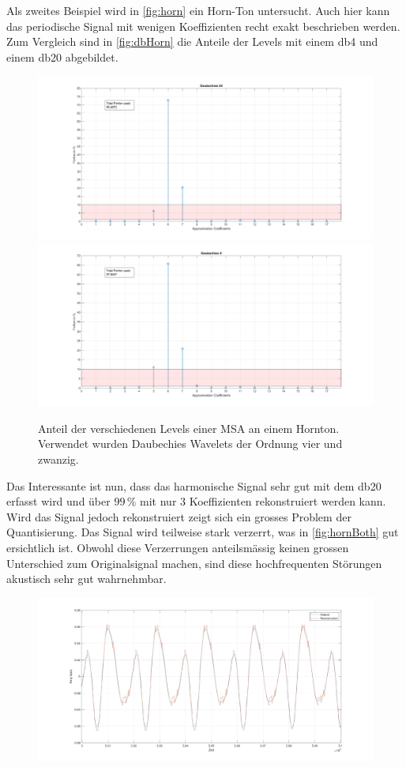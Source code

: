 \begin{refsection}
Als zweites Beispiel wird in \autoref{fig:horn} ein Horn-Ton untersucht.
Auch hier kann das periodische Signal mit wenigen Koeffizienten recht exakt beschrieben werden. 
Zum Vergleich sind in \autoref{fig:dbHorn} die Anteile der Levels mit einem db4 und einem db20 abgebildet.
\begin{figure}
	\includegraphics[width=0.5\linewidth]{papers/compress/Bilder/frenchHorn_db20.pdf}
	\includegraphics[width=0.5\linewidth]{papers/compress/Bilder/frenchHorn_db4.pdf}
	\caption{Anteil der verschiedenen Levels einer MSA an einem Hornton. Verwendet wurden Daubechies Wavelets der Ordnung vier und zwanzig.}
	\label{fig:dbHorn}
\end{figure}
Das Interessante ist nun, dass das harmonische Signal sehr gut mit dem db20 erfasst wird und über $99\,\text{\%}$ mit nur 3 Koeffizienten rekonstruiert werden kann.
Wird das Signal jedoch rekonstruiert zeigt sich ein grosses Problem der Quantisierung.
Das Signal wird teilweise stark verzerrt, was in \autoref{fig:hornBoth} gut ersichtlich ist.
Obwohl diese Verzerrungen anteilsmässig keinen grossen Unterschied zum Originalsignal machen, sind diese hochfrequenten Störungen akustisch sehr gut wahrnehmbar.
\begin{figure}
	\centering
	\includegraphics[width=\linewidth]{papers/compress/Bilder/hornBoth.pdf}

\end{figure}
\end{refsection}
